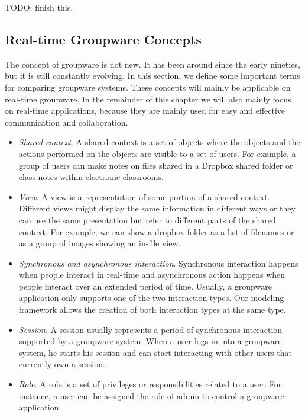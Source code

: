 TODO: finish this.

\subsection{Real-time Groupware Concepts}

The concept of groupware is not new. It has been around since the early nineties, but it is still constantly evolving. In this section, we define some important terms for comparing groupware systems. These concepts will mainly be applicable on real-time groupware. In the remainder of this chapter we will also mainly focus on real-time applications, because they are mainly used for easy and effective communication and collaboration.

\begin{itemize}
\item{\textit{Shared context}. A shared context is a set of objects where the objects and the actions performed on the objects are visible to a set of users. For example, a group of users can make notes on files shared in a Dropbox shared folder or class notes within electronic classrooms.}
\item{\textit{View}. A view is a representation of some portion of a shared context. Different views might display the same information in different ways or they can use the same presentation but refer to different parts of the shared context. For example, we can show a dropbox folder as a list of filenames or as a group of images showing an in-file view.}
\item{\textit{Synchronous and asynchronous interaction}. Synchronous interaction happens when people interact in real-time and asynchronous action happens when people interact over an extended period of time. Usually, a groupware application only supports one of the two interaction types. Our modeling framework allows the creation of both interaction types at the same type.}
\item{\textit{Session}. A session usually represents a period of synchronous interaction supported by a groupware system. When a user logs in into a groupware system, he starts his session and can start interacting with other users that currently own a session.}
\item{\textit{Role}. A role is a set of privileges or responsibilities related to a user. For instance, a user can be assigned the role of admin to control a groupware application.}
\end{itemize}

